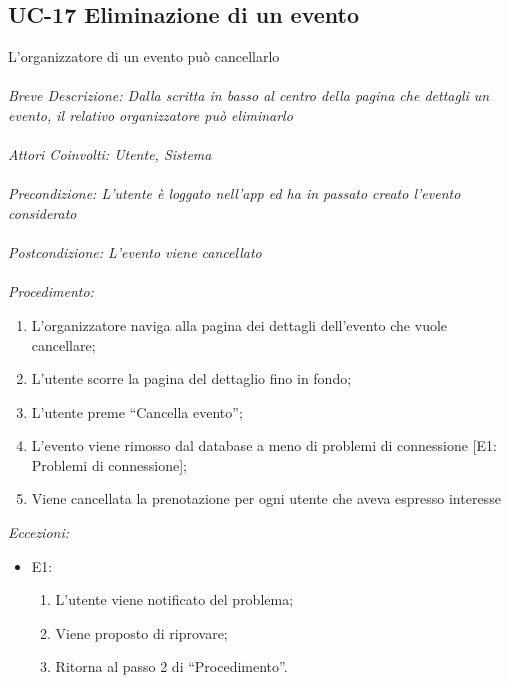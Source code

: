 \subsection{UC-17 Eliminazione di un evento}
L'organizzatore di un evento può cancellarlo
\\
\\
\textit{Breve Descrizione: Dalla scritta in basso al centro della pagina che dettagli un evento, il relativo organizzatore può eliminarlo} 
\\
\\
\textit{Attori Coinvolti: Utente, Sistema}
\\
\\
\textit{Precondizione: L'utente è loggato nell'app ed ha in passato creato l'evento considerato}
\\
\\
\textit{Postcondizione: L'evento viene cancellato}
\\
\\
\textit{Procedimento:}
\begin{enumerate}
	\item L'organizzatore naviga alla pagina dei dettagli dell'evento che vuole cancellare;
	\item L'utente scorre la pagina del dettaglio fino in fondo;
	\item L'utente preme ``Cancella evento'';
	\item L'evento viene rimosso dal database a meno di problemi di connessione [E1: Problemi di connessione];
	\item Viene cancellata la prenotazione per ogni utente che aveva espresso interesse
\end{enumerate}


\textit{Eccezioni:}
\begin{itemize}
	\item E1:
	\begin{enumerate}
		\item L'utente viene notificato del problema;
		\item Viene proposto di riprovare;
		\item Ritorna al passo 2 di ``Procedimento''.
	\end{enumerate}
\end{itemize}

